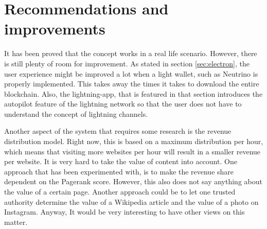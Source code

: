  

\section{Recommendations and improvements}
It has been proved that the concept works in a real life scenario. However, there is still plenty of room for improvement. As stated in section \ref{sec:electron}, the user experience might be improved a lot when a light wallet, such as Neutrino is properly implemented. This takes away the times it takes to download the entire blockchain. Also, the lightning-app, that is featured in that section introduces the autopilot feature of the lightning network so that the user does not have to understand the concept of lightning channels. 

Another aspect of the system that requires some research is the revenue distribution model. Right now, this is based on a maximum distribution per hour, which means that visiting more websites per hour will result in a smaller revenue per website. It is very hard to take the value of content into account. One approach that has been experimented with, is to make the revenue share dependent on the Pagerank score. However, this also does not say anything about the value of a certain page. Another approach could be to let one trusted authority determine the value of a Wikipedia article and the value of a photo on Instagram. Anyway, It would be very interesting to have other views on this matter. 